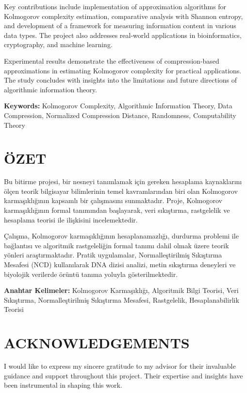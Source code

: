 \documentclass[12pt,a4paper]{report}
\begin{document}
Key contributions include implementation of approximation algorithms for Kolmogorov complexity estimation, comparative analysis with Shannon entropy, and development of a framework for measuring information content in various data types. The project also addresses real-world applications in bioinformatics, cryptography, and machine learning.

Experimental results demonstrate the effectiveness of compression-based approximations in estimating Kolmogorov complexity for practical applications. The study concludes with insights into the limitations and future directions of algorithmic information theory.

\textbf{Keywords:} Kolmogorov Complexity, Algorithmic Information Theory, Data Compression, Normalized Compression Distance, Randomness, Computability Theory

\chapter*{ÖZET}

Bu bitirme projesi, bir nesneyi tanımlamak için gereken hesaplama kaynaklarını ölçen teorik bilgisayar bilimlerinin temel kavramlarından biri olan Kolmogorov karmaşıklığının kapsamlı bir çalışmasını sunmaktadır. Proje, Kolmogorov karmaşıklığının formal tanımından başlayarak, veri sıkıştırma, rastgelelik ve hesaplama teorisi ile ilişkisini incelemektedir.

Çalışma, Kolmogorov karmaşıklığının hesaplanamazlığı, durdurma problemi ile bağlantısı ve algoritmik rastgeleliğin formal tanımı dahil olmak üzere teorik yönleri araştırmaktadır. Pratik uygulamalar, Normalleştirilmiş Sıkıştırma Mesafesi (NCD) kullanılarak DNA dizisi analizi, metin sıkıştırma deneyleri ve biyolojik verilerde örüntü tanıma yoluyla gösterilmektedir.

\textbf{Anahtar Kelimeler:} Kolmogorov Karmaşıklığı, Algoritmik Bilgi Teorisi, Veri Sıkıştırma, Normalleştirilmiş Sıkıştırma Mesafesi, Rastgelelik, Hesaplanabilirlik Teorisi

\chapter*{ACKNOWLEDGEMENTS}

I would like to express my sincere gratitude to my advisor for their invaluable guidance and support throughout this project. Their expertise and insights have been instrumental in shaping this work.
\end{document}
